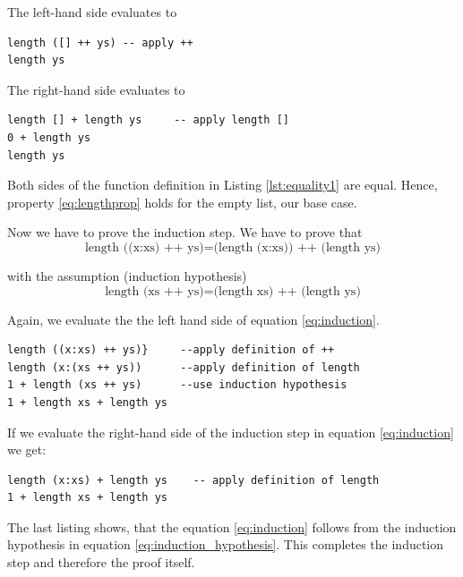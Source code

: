\documentclass[twoside, a4paper]{article}
\begin{document}
The left-hand side evaluates to
\begin{program}
\begin{verbatim}
length ([] ++ ys) -- apply ++
length ys
\end{verbatim}
\end{program}

The right-hand side evaluates to 
\begin{program}
\begin{verbatim}
length [] + length ys     -- apply length []
0 + length ys
length ys
\end{verbatim}
\end{program}

Both sides of the function definition in Listing \ref{lst:equality1} are equal. Hence, property \ref{eq:lengthprop} holds for the empty list, our base case.

Now we have to prove the induction step. We have to prove that
\begin{equation}
  \label{eq:induction}
    \text{length ((x:xs) ++ ys)} = \text{(length (x:xs)) ++ (length ys)}
\end{equation}

with the assumption (induction hypothesis)
\begin{equation}
  \label{eq:induction_hypothesis}
      \text{length (xs ++ ys)} = \text{(length xs) ++ (length ys)}
\end{equation}

Again, we evaluate the the left hand side of equation \ref{eq:induction}.

\begin{program}
\begin{verbatim}
length ((x:xs) ++ ys)}     --apply definition of ++
length (x:(xs ++ ys))      --apply definition of length
1 + length (xs ++ ys)      --use induction hypothesis
1 + length xs + length ys
\end{verbatim}
\end{program}

If we evaluate the right-hand side of the induction step in equation  \ref{eq:induction} we get:
\begin{program}
\begin{verbatim}
length (x:xs) + length ys    -- apply definition of length
1 + length xs + length ys
\end{verbatim}
\end{program}

The last listing shows, that the equation \ref{eq:induction} follows from the induction hypothesis in equation \ref{eq:induction_hypothesis}. This completes the induction step and therefore the proof itself.
\end{document}

